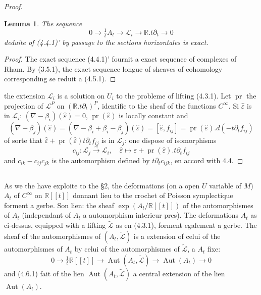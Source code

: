 \documentclass[11pt,a4paper]{article}
\theoremstyle{plain}
\newtheorem{lemma}[theorem]{Lemma}
\theoremstyle{definition}
\DeclareMathOperator{\Aut}{Aut}
\DeclareMathOperator{\pr}{pr}
\newcommand{\R}{\mathbb{R}}
\newcommand{\iso}{\xrightarrow{\sim}}
\begin{document}
\begin{proof}
\begin{lemma}
The sequence
\begin{equation}
0 \longrightarrow \tfrac{1}{t}A_{t} \longrightarrow \mathcal{L}_{i} \longrightarrow \R.t\partial_{t} \longrightarrow 0 \tag{4.5.1}
\end{equation}
deduite of (4.4.1)' by passage to the sections horizontales is exact.
\end{lemma}

\begin{proof}
The exact sequence (4.4.1)' fournit a exact sequence of complexes of Rham.
By (3.5.1), the exact sequence longue of sheaves of cohomology corresponding se
reduit a (4.5.1).
\end{proof}

the extension $\mathcal{L}_{i}$ is a solution on $U_{i}$ to the probleme of lifting (4.3.1). Let $\pr$ the projection of $\mathcal{L}^{P}$ on $(\R.t\partial_{t})^{P}$, identifie to the sheaf of the functions $C^{\infty}$. Si $\hat{\varepsilon}$ is in $\mathcal{L}_{i}$:
$(\nabla - \beta_{i})(\hat{\varepsilon}) = 0$,
$\pr(\hat{\varepsilon})$ is locally constant and
\[
(\nabla - \beta_{j})(\hat{\varepsilon}) = (\nabla - \beta_{i} + \beta_{i} - \beta_{j})(\hat{\varepsilon}) = [\hat{\varepsilon}, f_{ij}] = \pr(\hat{\varepsilon}).d(-t\partial_{t} f_{ij})
\]
of sorte that $\hat{\varepsilon} + \pr(\hat{\varepsilon}) t\partial_{t} f_{ij}$ is in $\mathcal{L}_{j}$: one dispose of isomorphisms
\[
c_{ij}: \mathcal{L}_{j} \iso \mathcal{L}_{i}, \quad \hat{\varepsilon} \longmapsto \hat{\varepsilon} + \pr(\hat{\varepsilon}).t\partial_{t} f_{ij}
\]
and $c_{ik} - c_{ij}c_{jk}$ is the automorphism defined by $t\partial_{t}c_{ijk}$, en accord with 4.4.
\end{proof}

\subsection{}
As we the have exploite to the \S 2, the deformations (on a open $U$ variable
of $M$) $A_{t}$ of $C^{\infty}$ on $\R[[t]]$ donnant lieu to the crochet of Poisson symplectique forment
a gerbe. Son lien: the sheaf $\exp(A_{t}/\R[[t]])$ of the automorphismes of $A_{t}$ (independant of $A_{t}$ a automorphism interieur pres). The deformations $A_{t}$ as ci-dessus, equipped with a lifting $\widetilde{\mathcal{L}}$ as en (4.3.1), forment egalement a gerbe. The sheaf of the automorphismes of $(A_{t}, \widetilde{\mathcal{L}})$ is a extension of celui of the automorphismes of $A_{t}$ by celui of the automorphismes of $\widetilde{\mathcal{L}}$, a $A_{t}$ fixe:
\begin{equation}
0 \longrightarrow \tfrac{1}{t}\R[[t]] \longrightarrow \Aut(A_{t}, \widetilde{\mathcal{L}}) \longrightarrow \Aut(A_{t}) \longrightarrow 0 \tag{4.6.1}
\end{equation}
and (4.6.1) fait of the lien $\Aut(A_{t}, \widetilde{\mathcal{L}})$ a central extension of the lien $\Aut(A_{t})$.
\end{document}
